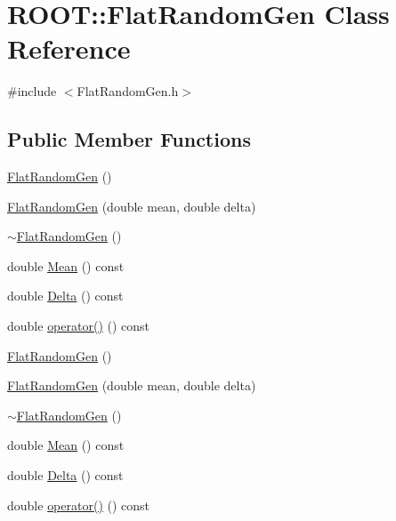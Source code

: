 \hypertarget{classROOT_1_1Minuit2_1_1FlatRandomGen}{}\section{R\+O\+OT\+:\+:Flat\+Random\+Gen Class Reference}
\label{classROOT_1_1Minuit2_1_1FlatRandomGen}


{\ttfamily \#include $<$Flat\+Random\+Gen.\+h$>$}

\subsection*{Public Member Functions}
\begin{DoxyCompactItemize}
\item 
\mbox{\hyperlink{classROOT_1_1Minuit2_1_1FlatRandomGen_a238bf80afeb93f2ecc95c8beedd39226}{Flat\+Random\+Gen}} ()
\item 
\mbox{\hyperlink{classROOT_1_1Minuit2_1_1FlatRandomGen_aeaa2e6e985b742a44530f12b4a1b3198}{Flat\+Random\+Gen}} (double mean, double delta)
\item 
\mbox{\hyperlink{classROOT_1_1Minuit2_1_1FlatRandomGen_a333b1c673238489f20dfba12ee1eac14}{$\sim$\+Flat\+Random\+Gen}} ()
\item 
double \mbox{\hyperlink{classROOT_1_1Minuit2_1_1FlatRandomGen_ab934b4a66f13eaaf30c9a9280c7ddb10}{Mean}} () const
\item 
double \mbox{\hyperlink{classROOT_1_1Minuit2_1_1FlatRandomGen_ad277acd252616d99e83d3438065cc154}{Delta}} () const
\item 
double \mbox{\hyperlink{classROOT_1_1Minuit2_1_1FlatRandomGen_ac04ef969864af18fdfdc104f2491e031}{operator()}} () const
\item 
\mbox{\hyperlink{classROOT_1_1Minuit2_1_1FlatRandomGen_a238bf80afeb93f2ecc95c8beedd39226}{Flat\+Random\+Gen}} ()
\item 
\mbox{\hyperlink{classROOT_1_1Minuit2_1_1FlatRandomGen_aeaa2e6e985b742a44530f12b4a1b3198}{Flat\+Random\+Gen}} (double mean, double delta)
\item 
\mbox{\hyperlink{classROOT_1_1Minuit2_1_1FlatRandomGen_a333b1c673238489f20dfba12ee1eac14}{$\sim$\+Flat\+Random\+Gen}} ()
\item 
double \mbox{\hyperlink{classROOT_1_1Minuit2_1_1FlatRandomGen_ab934b4a66f13eaaf30c9a9280c7ddb10}{Mean}} () const
\item 
double \mbox{\hyperlink{classROOT_1_1Minuit2_1_1FlatRandomGen_ad277acd252616d99e83d3438065cc154}{Delta}} () const
\item 
double \mbox{\hyperlink{classROOT_1_1Minuit2_1_1FlatRandomGen_ac04ef969864af18fdfdc104f2491e031}{operator()}} () const
\end{DoxyCompactItemize}


